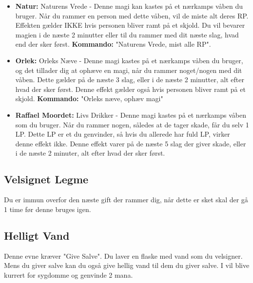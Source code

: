 \begin{itemize}
    \item \textbf{Natur:} Naturens Vrede - Denne magi kan kastes på et nærkamps våben du bruger. Når du rammer en person med dette våben, vil de miste alt deres RP. Effekten gælder IKKE hvis personen bliver ramt på et skjold. Du vil bevarer magien i de næste 2 minutter eller til du rammer med dit næste slag, hvad end der sker først. \textbf{Kommando:} "Naturens Vrede, mist alle RP".
    \item \textbf{Orlek:} Orleks Næve - Denne magi kastes på et nærkamps våben du bruger, og det tillader dig at ophæve en magi, når du rammer noget/nogen med dit våben. Dette gælder på de næste 3 slag, eller i de næste 2 minutter, alt efter hvad der sker først. Denne effekt gælder også hvis personen bliver ramt på et skjold. \textbf{Kommando:} "Orleks næve, ophæv magi"
    \item \textbf{Raffael Moordet:} Livs Drikker -  Denne magi kastes på et nærkamps våben som du bruger. Når du rammer nogen, således at de tager skade, får du selv 1 LP. Dette LP er et du genvinder, så hvis du allerede har fuld LP, virker denne effekt ikke. Denne effekt varer på de næste 5 slag der giver skade, eller i de næste 2 minuter, alt efter hvad der sker først.
\end{itemize}

\subsection{Velsignet Legme}
Du er immun overfor den næste gift der rammer dig, når dette er sket skal der gå 1 time før denne bruges igen. 

\subsection{Helligt Vand}
Denne evne kræver "Give Salve". Du laver en flaske med vand som du velsigner. Mens du giver salve kan du også give hellig vand til dem du giver salve. I vil blive kurrert for sygdomme og genvinde 2 mana.
